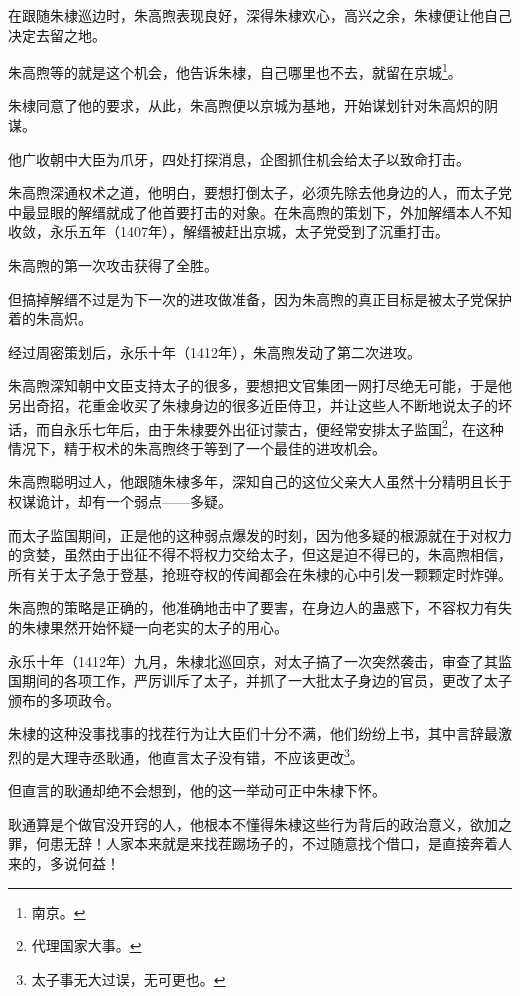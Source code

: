 \begin{multicols}{\theparacolNo}
在跟随朱棣巡边时，朱高煦表现良好，深得朱棣欢心，高兴之余，朱棣便让他自己决定去留之地。

朱高煦等的就是这个机会，他告诉朱棣，自己哪里也不去，就留在京城\footnote{南京。}。

朱棣同意了他的要求，从此，朱高煦便以京城为基地，开始谋划针对朱高炽的阴谋。

他广收朝中大臣为爪牙，四处打探消息，企图抓住机会给太子以致命打击。

朱高煦深通权术之道，他明白，要想打倒太子，必须先除去他身边的人，而太子党中最显眼的解缙就成了他首要打击的对象。在朱高煦的策划下，外加解缙本人不知收敛，永乐五年（1407年），解缙被赶出京城，太子党受到了沉重打击。

朱高煦的第一次攻击获得了全胜。

但搞掉解缙不过是为下一次的进攻做准备，因为朱高煦的真正目标是被太子党保护着的朱高炽。

经过周密策划后，永乐十年（1412年），朱高煦发动了第二次进攻。

朱高煦深知朝中文臣支持太子的很多，要想把文官集团一网打尽绝无可能，于是他另出奇招，花重金收买了朱棣身边的很多近臣侍卫，并让这些人不断地说太子的坏话，而自永乐七年后，由于朱棣要外出征讨蒙古，便经常安排太子监国\footnote{代理国家大事。}，在这种情况下，精于权术的朱高煦终于等到了一个最佳的进攻机会。

朱高煦聪明过人，他跟随朱棣多年，深知自己的这位父亲大人虽然十分精明且长于权谋诡计，却有一个弱点——多疑。

而太子监国期间，正是他的这种弱点爆发的时刻，因为他多疑的根源就在于对权力的贪婪，虽然由于出征不得不将权力交给太子，但这是迫不得已的，朱高煦相信，所有关于太子急于登基，抢班夺权的传闻都会在朱棣的心中引发一颗颗定时炸弹。

朱高煦的策略是正确的，他准确地击中了要害，在身边人的蛊惑下，不容权力有失的朱棣果然开始怀疑一向老实的太子的用心。

永乐十年（1412年）九月，朱棣北巡回京，对太子搞了一次突然袭击，审查了其监国期间的各项工作，严厉训斥了太子，并抓了一大批太子身边的官员，更改了太子颁布的多项政令。

朱棣的这种没事找事的找茬行为让大臣们十分不满，他们纷纷上书，其中言辞最激烈的是大理寺丞耿通，他直言太子没有错，不应该更改\footnote{太子事无大过误，无可更也。}。

但直言的耿通却绝不会想到，他的这一举动可正中朱棣下怀。

耿通算是个做官没开窍的人，他根本不懂得朱棣这些行为背后的政治意义，欲加之罪，何患无辞！人家本来就是来找茬踢场子的，不过随意找个借口，是直接奔着人来的，多说何益！


\end{multicols}
